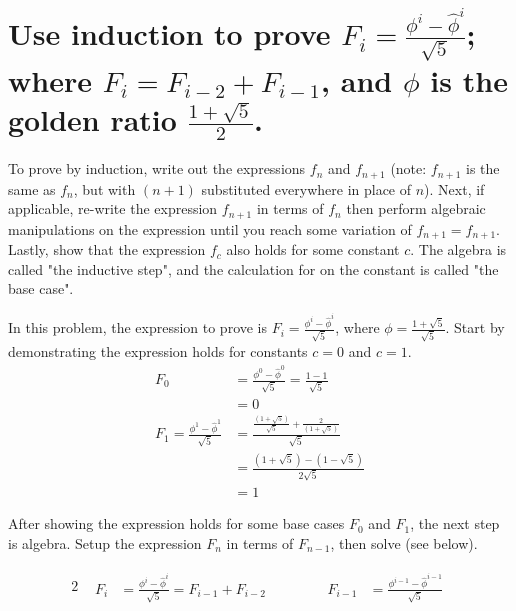 \section[Problem 2]{Use induction to prove $F_i = \frac{\phi^i - \hat{\phi}^i}{\sqrt{5}}$; where $F_i = F_{i-2} + F_{i-1}$, and $\phi$ is the golden ratio $\frac{1 + \sqrt{5}}{2}$.}

To prove by induction, write out the expressions $f_n$ and $f_{n + 1}$ (note: $f_{n + 1}$ is the same as $f_n$, but with $(n + 1)$ substituted everywhere in place of $n$). Next, if applicable, re-write the expression $f_{n + 1}$ in terms of $f_n$ then perform algebraic manipulations on the expression until you reach some variation of $f_{n + 1} = f_{n + 1}$.  Lastly, show that the expression $f_c$ also holds for some constant $c$. The algebra is called "the inductive step", and the calculation for on the constant is called "the base case".

In this problem, the expression to prove is $F_i = \frac{\phi^i - \hat{\phi}^i}{\sqrt{5}}$, where $\phi = \frac{1 + \sqrt{5}}{\sqrt{5}}$. Start by demonstrating the expression holds for constants $c = 0$ and $c = 1$.
\begin{align*}
	F_0 &= \frac{\phi^0 - \hat{\phi}^0}{\sqrt{5}} = \frac{1 - 1}{\sqrt{5}} \\
		&= 0 \\
	F_1 = \frac{\phi^1 - \hat{\phi}^1}{\sqrt{5}} &= \frac{\frac{\left( 1 + \sqrt{5} \right)}{\sqrt{5}} + \frac{2}{\left( 1 + \sqrt{5} \right)}}{\sqrt{5}} \\
	&= 
	\frac{\left( 1 + \sqrt{5} \right) - \left( 1 - \sqrt{5} \right)}{2 \sqrt{5}} \\
	&=
	1
\end{align*}

After showing the expression holds for some base cases $F_0$ and $F_1$, the next step is algebra. Setup the expression $F_n$ in terms of $F_{n - 1}$, then solve (see below). 

\setcounter{equation}{0}
\begin{alignat*}{2}
	&
	\begin{aligned}
		F_i &= \frac{\phi^i - \hat{\phi}^i}{\sqrt{5}} = F_{i - 1} + F_{i - 2}
	\end{aligned}
	& \qquad &
	\begin{aligned}
		F_{i - 1} &= \frac{\phi^{i - 1} - \hat{\phi}^{i - 1}}{\sqrt{5}}
	\end{aligned}
\end{alignat*}

